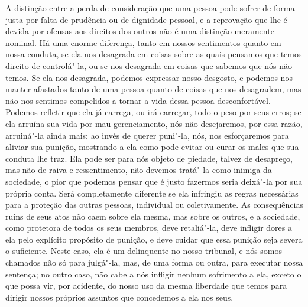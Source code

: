 A distinção entre a perda de consideração que uma pessoa pode sofrer
de forma justa por falta de prudência ou de dignidade pessoal, e a
reprovação que lhe é devida por ofensas aos direitos dos outros não é
uma distinção meramente nominal. Há uma enorme diferença, tanto em
nossos sentimentos quanto em nossa conduta, se ela nos desagrada em
coisas sobre as quais pensamos que temos direito de controlá"-la, ou
se nos desagrada em coisas que sabemos que nós não temos. Se ela nos
desagrada, podemos expressar nosso desgosto, e podemos nos manter
afastados tanto de uma pessoa quanto de coisas que nos desagradem, mas
não nos sentimos compelidos a tornar a vida dessa pessoa desconfortável.
Podemos refletir que ela já carrega, ou irá carregar, todo o peso por
seus erros; se ela arruína sua vida por mau gerenciamento, nós não
desejaremos, por essa razão, arruiná"-la ainda mais: ao invés de
querer puni"-la, nós, nos esforçaremos para aliviar sua
punição, mostrando a ela como pode evitar ou curar os males que sua conduta lhe
traz. Ela pode ser para nós objeto de piedade, talvez de desapreço,
mas não de raiva e ressentimento, não devemos tratá"-la como inimiga
da sociedade, o pior que podemos pensar que é justo fazermos seria
deixá"-la por sua própria conta. Será completamente diferente se ela
infringiu as regras necessárias para a proteção das outras pessoas,
individual ou coletivamente. As consequências ruins de seus atos não
caem sobre ela mesma, mas sobre os outros, e a sociedade, como
protetora de todos os seus membros, deve retaliá"-la, deve
infligir dores a ela pelo explícito propósito de punição, e deve cuidar
que essa punição seja severa o suficiente. Neste caso, ela é um
delinquente no nosso tribunal, e nós somos chamados não só para 
julgá"-la, mas, de uma forma ou outra, para executar nossa
sentença; no outro caso, não cabe a nós infligir nenhum sofrimento a
ela, exceto o que possa vir, por acidente, do nosso uso da mesma
liberdade que temos para dirigir nossos próprios assuntos que
concedemos a ela nos seus. 

